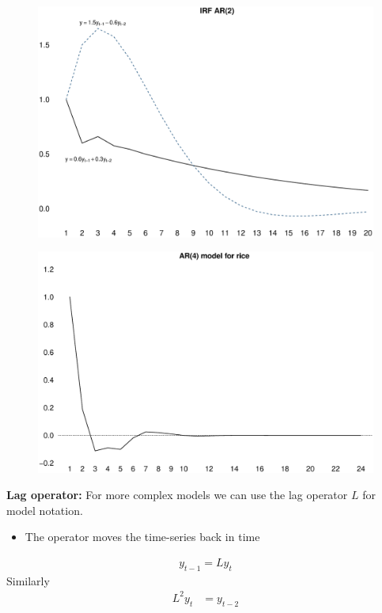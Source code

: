 \documentclass{beamer}
\begin{document}
\begin{frame}
  \begin{figure}
    \includegraphics[scale=.3]{irf_ar2.eps}
  \end{figure}
\end{frame}

\begin{frame}
  \begin{figure}
    \includegraphics[scale=.3]{rice4.eps}
  \end{figure}
\end{frame}

\begin{frame}
  \textbf{Lag operator:} For more complex models we can use the lag operator $L$ for model notation.
  \begin{itemize}
    \item The operator moves the time-series back in time
  \end{itemize}
  \begin{align}
      y_{t-1}=Ly_t
    \end{align}   
    \medskip
    Similarly
    \begin{align}
       L^2y_t &= y_{t-2}
      \end{align}  
\end{frame}
\end{document}
